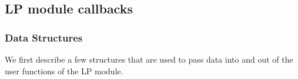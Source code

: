 
\subsection{LP module callbacks}
\label{user-written-lp}

\subsubsection{Data Structures}
\label{data_structures}

We first describe a few structures that are used to pass
data into and out of the user functions of the LP module.

